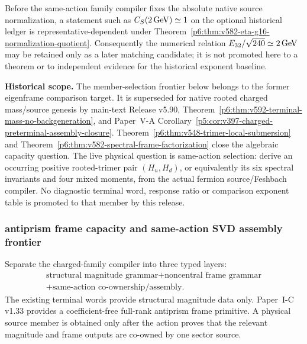 \documentclass[12pt,a4paper]{article}
\begin{document}
\begin{corollary}
\label{p6:cor:v582-near-unity-not-invariant}
Before the same-action family compiler fixes the absolute native source
normalization, a statement such as $C_S(2\,{\rm GeV})\simeq1$ on the optional
historical ledger is representative-dependent under
Theorem~\ref{p6:thm:v582-eta-g16-normalization-quotient}.  Consequently the
numerical relation $E_{32}/\sqrt{240}\simeq2\,{\rm GeV}$ may be retained only
as a later matching candidate; it is not promoted here to a theorem or to
independent evidence for the historical exponent baseline.
\end{corollary}

\begin{remark}
\label{p6:rem:v582-sharper-live-flavor-frontier}
\noindent\textbf{Historical scope.} The member-selection frontier below
belongs to the former eigenframe comparison target. It is superseded for
native rooted charged mass/source genesis by main-text Release v5.90,
Theorem~\ref{p6:thm:v592-terminal-mass-no-backgeneration}, and Paper~V-A
Corollary~\ref{p5:cor:v397-charged-preterminal-assembly-closure}.
Theorem~\ref{p6:thm:v548-trimer-local-submersion} and
Theorem~\ref{p6:thm:v582-spectral-frame-factorization} close the algebraic
capacity question.  The live physical question is same-action selection:
derive an occurring positive rooted-trimer pair $(H_u,H_d)$, or equivalently
its six spectral invariants and four mixed moments, from the actual fermion
source/Feshbach compiler.  No diagnostic terminal word, response ratio or
comparison exponent table is promoted to that member by this release.
\end{remark}

\subsubsection*{antiprism frame capacity and same-action SVD assembly frontier}
\label{p6:sec:v583-antiprism-svd-assembly}

\begin{definition}
\label{p6:def:v583-magnitude-frame-assembly}
Separate the charged-family compiler into three typed layers:
\[
 \begin{gathered}
 \boxed{\text{structural magnitude grammar}}
 +\boxed{\text{noncentral frame grammar}}\\[3pt]
 +\boxed{\text{same-action co-ownership/assembly}}.
 \end{gathered}
\]
The existing terminal words provide structural magnitude data only.  Paper~I-C
v1.33 provides a coefficient-free full-rank antiprism frame primitive.  A
physical source member is obtained only after the action proves that the
relevant magnitude and frame outputs are co-owned by one sector source.
\end{definition}
\end{document}

